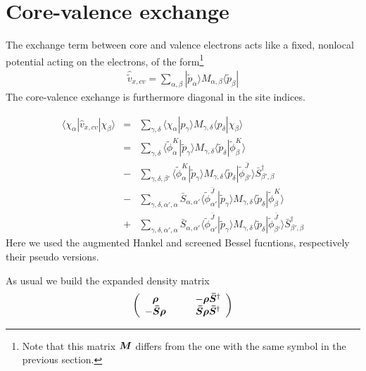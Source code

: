 \documentclass[11pt,a4paper]{report}
\begin{document}
\section{Core-valence exchange}
The exchange term between core and valence electrons acts like a
fixed, nonlocal potential acting on the electrons, of the
form\footnote{Note that this matrix $\bm{M}$ differs from the one
  with the same symbol in the previous section.}
\begin{eqnarray}
\hat{\tilde{v}}_{x,cv}=\sum_{\alpha,\beta}|\tilde{p}_\alpha\rangle 
M_{\alpha,\beta}\langle\tilde{p}_\beta|
\end{eqnarray}
The core-valence exchange is furthermore diagonal in the site indices.

\begin{eqnarray}
\langle\chi_\alpha|\hat{v}_{x,cv}|\chi_\beta\rangle
&=&
\sum_{\gamma,\delta}
\langle\chi_\alpha|p_\gamma\rangle 
M_{\gamma,\delta}\langle p_\delta|\chi_\beta\rangle
\nonumber\\
&=&
\sum_{\gamma,\delta}
\langle\tilde{\phi}^{K}_\alpha|\tilde{p}_\gamma\rangle 
M_{\gamma,\delta}
\langle\tilde{p}_\delta|\tilde{\phi}^{K}_\beta\rangle
\nonumber\\
&-&
\sum_{\gamma,\delta,\beta'}
\langle\tilde{\phi}^{K}_\alpha|\tilde{p}_\gamma\rangle 
M_{\gamma,\delta}
\langle\tilde{p}_\delta|\tilde{\phi}^{\bar{J}}_{\beta'}\rangle 
\bar{S}^\dagger_{\beta',\beta}
\nonumber\\
&-&
\sum_{\gamma,\delta,\alpha',\alpha}
\bar{S}_{\alpha,\alpha'}
\langle\tilde{\phi}^{\bar{J}}_{\alpha'}|\tilde{p}_\gamma\rangle 
M_{\gamma,\delta}
\langle\tilde{p}_\delta|\tilde{\phi}^{K}_{\beta}\rangle 
\nonumber\\
&+&
\sum_{\gamma,\delta,\alpha',\alpha}
\bar{S}_{\alpha,\alpha'}
\langle\tilde{\phi}^{\bar{J}}_{\alpha'}|\tilde{p}_\gamma\rangle 
M_{\gamma,\delta}
\langle\tilde{p}_\delta|\tilde{\phi}^{\bar{J}}_{\beta'}\rangle 
\bar{S}^\dagger_{\beta',\beta}
\end{eqnarray}
Here we used the augmented Hankel and screened Bessel fucntions,
respectively their pseudo versions.

As usual we build the expanded density matrix
\begin{eqnarray}
\left(\begin{array}{cc}
  \bm{\rho} \qquad& 
-\bm{\rho}\bm{\bar{S}}^\dagger\\
-\bm{\bar{S}}\bm{\rho} \qquad& 
\bm{\bar{S}}\bm{\rho}\bm{\bar{S}}^\dagger\\
\end{array}\right)
\end{eqnarray}
\end{document}
